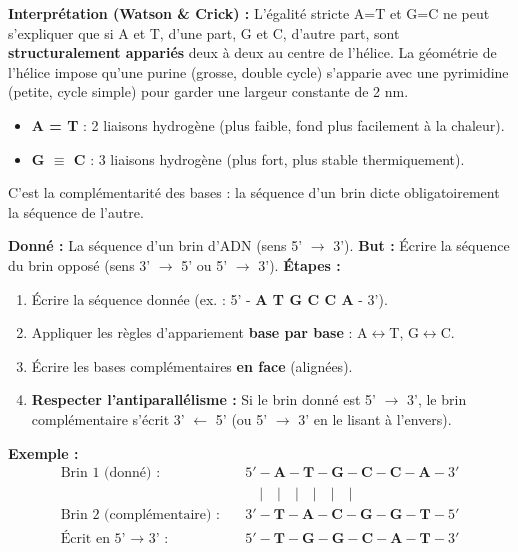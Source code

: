 \documentclass[11pt]{article}
\newcommand{\cle}[1]{{\popxbold\color{popdark}#1}}
\begin{document}
\noindent\textbf{Interprétation (Watson \& Crick) :} L'égalité stricte A=T et G=C ne peut s'expliquer que si A et T, d'une part, G et C, d'autre part, sont \textbf{structuralement appariés} deux à deux au centre de l'hélice. La géométrie de l'hélice impose qu'une purine (grosse, double cycle) s'apparie avec une pyrimidine (petite, cycle simple) pour garder une largeur constante de 2 nm.
\begin{itemize}
    \item \textbf{A = T} : 2 liaisons hydrogène (plus faible, fond plus facilement à la chaleur).
    \item \textbf{G $\equiv$ C} : 3 liaisons hydrogène (plus fort, plus stable thermiquement).
\end{itemize}
C'est la \cle{complémentarité des bases} : la séquence d'un brin dicte obligatoirement la séquence de l'autre.

\begin{methode}
\textbf{Donné :} La séquence d'un brin d'ADN (sens 5' $\rightarrow$ 3').
\textbf{But :} Écrire la séquence du brin opposé (sens 3' $\rightarrow$ 5' ou 5' $\rightarrow$ 3').
\textbf{Étapes :}
\begin{enumerate}
    \item Écrire la séquence donnée (ex. : 5' - \textbf{A T G C C A} - 3').
    \item Appliquer les règles d'appariement \textbf{base par base} : A$\leftrightarrow$T, G$\leftrightarrow$C.
    \item Écrire les bases complémentaires \textbf{en face} (alignées).
    \item \textbf{Respecter l'antiparallélisme :} Si le brin donné est 5' $\rightarrow$ 3', le brin complémentaire s'écrit 3' $\leftarrow$ 5' (ou 5' $\rightarrow$ 3' en le lisant à l'envers).
\end{enumerate}
\textbf{Exemple :}
\begin{align*}
\text{Brin 1 (donné) :} \quad & 5' - \textbf{A} - \textbf{T} - \textbf{G} - \textbf{C} - \textbf{C} - \textbf{A} - 3' \\
                              & \quad | \quad | \quad | \quad | \quad | \quad | \\
\text{Brin 2 (complémentaire) :} \quad & 3' - \textbf{T} - \textbf{A} - \textbf{C} - \textbf{G} - \textbf{G} - \textbf{T} - 5' \\
\text{Écrit en 5' $\rightarrow$ 3' :} \quad & 5' - \textbf{T} - \textbf{G} - \textbf{G} - \textbf{C} - \textbf{A} - \textbf{T} - 3'
\end{align*}
\end{methode}
\end{document}
